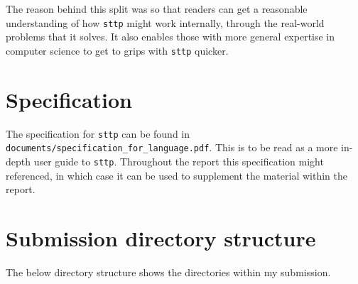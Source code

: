 \documentclass[]{full}
\theoremstyle{definition}
\begin{document}
The reason behind this split was so that readers can get a reasonable understanding of how \verb|sttp| might work internally, through the real-world problems that it solves. It also enables those with more general expertise in computer science to get to grips with \verb|sttp| quicker.

\section{Specification}

The specification for \verb|sttp| can be found in \verb|documents/specification_for_language.pdf|. This is to be read as a more in-depth user guide to \verb|sttp|. Throughout the report this specification might referenced, in which case it can be used to supplement the material within the report.

\section{Submission directory structure}

The below directory structure shows the directories within my submission.
\end{document}
